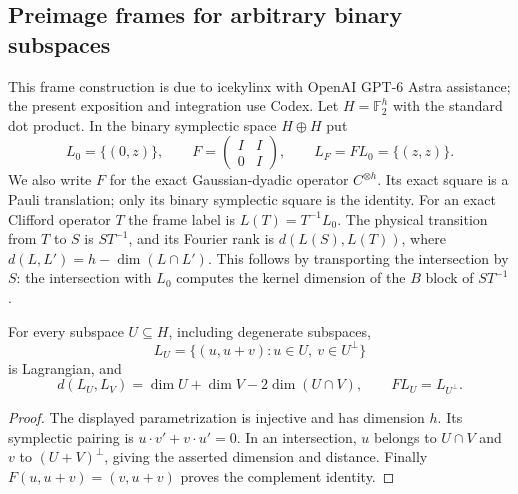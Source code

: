 \subsection{Preimage frames for arbitrary binary subspaces}
This frame construction is due to icekylinx with OpenAI GPT-6 Astra assistance;
the present exposition and integration use Codex.
Let $H=\mathbb F_2^h$ with the standard dot product. In the binary
symplectic space $H\oplus H$ put
\[
 L_0=\{(0,z)\},\qquad
 F=\begin{pmatrix}I&I\\0&I\end{pmatrix},\qquad
 L_F=FL_0=\{(z,z)\}.
\]
We also write $F$ for the exact Gaussian-dyadic operator $C^{\otimes h}$.
Its exact square is a Pauli translation; only its binary symplectic square
is the identity. For an exact Clifford operator $T$ the frame label is
$L(T)=T^{-1}L_0$. The physical transition from $T$ to $S$ is $ST^{-1}$,
and its Fourier rank is
$d(L(S),L(T))$, where $d(L,L')=h-\dim(L\cap L')$.
This follows by transporting the intersection by $S$: the intersection
with $L_0$ computes the kernel dimension of the $B$ block of $ST^{-1}$.

\begin{lemma}
For every subspace $U\subseteq H$, including degenerate subspaces,
\[
 L_U=\{(u,u+v):u\in U,\ v\in U^\perp\}
\]
is Lagrangian, and
\[
 d(L_U,L_V)=\dim U+\dim V-2\dim(U\cap V),\qquad
 FL_U=L_{U^\perp}.
\]
\end{lemma}
\begin{proof}
The displayed parametrization is injective and has dimension $h$.
Its symplectic pairing is $u\cdot v'+v\cdot u'=0$.
In an intersection, $u$ belongs to $U\cap V$ and $v$ to
$(U+V)^\perp$, giving the asserted dimension and distance.
Finally $F(u,u+v)=(v,u+v)$ proves the complement identity.
\end{proof}

